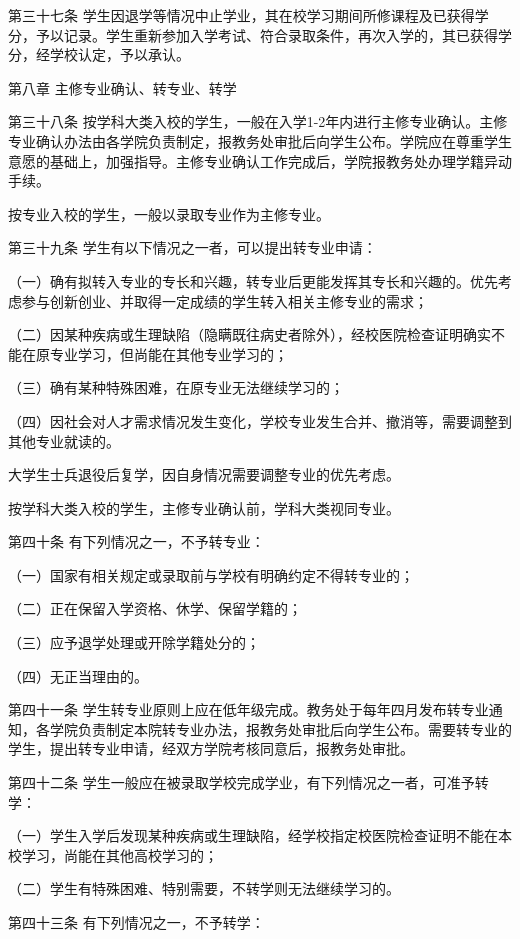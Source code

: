 \documentclass[UTF8,12pt,a4paper]{report}
\begin{document}
第三十七条  学生因退学等情况中止学业，其在校学习期间所修课程及已获得学分，予以记录。学生重新参加入学考试、符合录取条件，再次入学的，其已获得学分，经学校认定，予以承认。



第八章  主修专业确认、转专业、转学

第三十八条  按学科大类入校的学生，一般在入学1-2年内进行主修专业确认。主修专业确认办法由各学院负责制定，报教务处审批后向学生公布。学院应在尊重学生意愿的基础上，加强指导。主修专业确认工作完成后，学院报教务处办理学籍异动手续。

按专业入校的学生，一般以录取专业作为主修专业。

第三十九条  学生有以下情况之一者，可以提出转专业申请：

（一）确有拟转入专业的专长和兴趣，转专业后更能发挥其专长和兴趣的。优先考虑参与创新创业、并取得一定成绩的学生转入相关主修专业的需求；

（二）因某种疾病或生理缺陷（隐瞒既往病史者除外），经校医院检查证明确实不能在原专业学习，但尚能在其他专业学习的；

（三）确有某种特殊困难，在原专业无法继续学习的；

（四）因社会对人才需求情况发生变化，学校专业发生合并、撤消等，需要调整到其他专业就读的。

大学生士兵退役后复学，因自身情况需要调整专业的优先考虑。

按学科大类入校的学生，主修专业确认前，学科大类视同专业。

第四十条  有下列情况之一，不予转专业：

（一）国家有相关规定或录取前与学校有明确约定不得转专业的；

（二）正在保留入学资格、休学、保留学籍的；

（三）应予退学处理或开除学籍处分的；

（四）无正当理由的。

第四十一条  学生转专业原则上应在低年级完成。教务处于每年四月发布转专业通知，各学院负责制定本院转专业办法，报教务处审批后向学生公布。需要转专业的学生，提出转专业申请，经双方学院考核同意后，报教务处审批。

第四十二条  学生一般应在被录取学校完成学业，有下列情况之一者，可准予转学：

（一）学生入学后发现某种疾病或生理缺陷，经学校指定校医院检查证明不能在本校学习，尚能在其他高校学习的；　　

（二）学生有特殊困难、特别需要，不转学则无法继续学习的。

第四十三条  有下列情况之一，不予转学：
\end{document}
